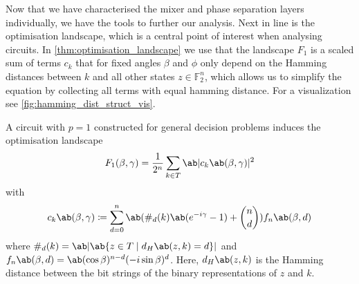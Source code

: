 Now that we have characterised the mixer and phase separation layers individually, we have the tools to further our analysis. Next in line is the optimisation landscape, which is a central point of interest when analysing \QAOA circuits. In \cref{thm:optimisation_landscape} we use that the landscape $F_1$ is a scaled sum of terms $c_k$ that for fixed angles $\beta$ and $\phi$ only depend on the Hamming distances between $k$ and all other states $z \in \mathds{F}_2^n$, which allows us to simplify the equation by collecting all terms with equal hamming distance. For a visualization see \cref{fig:hamming_dist_struct_vis}.

\begin{lemma}
  \label{thm:optimisation_landscape}
  A \QAOA circuit with $p=1$ constructed for general decision problems induces the optimisation landscape
  \begin{equation}
    \label{eq:F_1}
    F_1(\mangle, \pangle) = \frac{1}{2^n} \sum_{k \in T} \ab|c_k\ab(\mangle,\pangle)|^2
  \end{equation}
%
  with 
  \begin{equation}
    \label{eq:c_k}
      c_k\ab(\mangle,\pangle) \coloneqq \sum_{d=0}^n \ab(\#_d (k) \ab(e^{-i \pangle} - 1) + \binom{n}{d}) f_n \ab(\mangle, d)
  \end{equation}
    where $\#_d (k) = \ab|\ab\{z \in T \mid d_H\ab(z,k) = d \}|$ and $f_n \ab(\mangle, d) = \ab(\cos \mangle)^{n-d} (-i \sin \mangle)^d$. Here, $d_H\ab(z,k)$ is the Hamming distance between the bit strings of the binary representations of $z$ and $k$.
\end{lemma}

